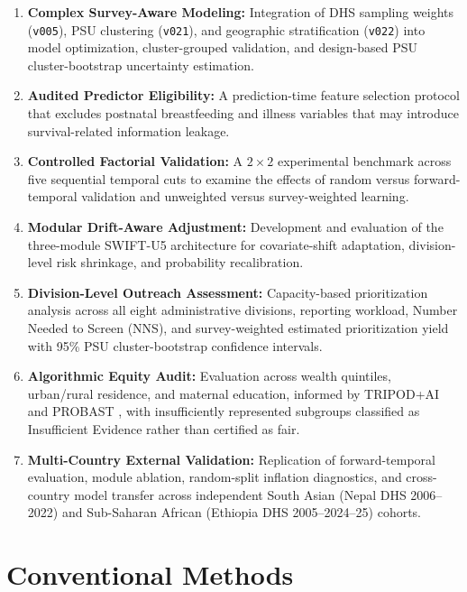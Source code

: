 \documentclass[a4paper,fleqn]{cas-sc}
\begin{document}
\begin{enumerate}
    \item \textbf{Complex Survey-Aware Modeling:} Integration of DHS sampling weights (\texttt{v005}), PSU clustering (\texttt{v021}), and geographic stratification (\texttt{v022}) into model optimization, cluster-grouped validation, and design-based PSU cluster-bootstrap uncertainty estimation.

    \item \textbf{Audited Predictor Eligibility:} A prediction-time feature selection protocol that excludes postnatal breastfeeding and illness variables that may introduce survival-related information leakage.

    \item \textbf{Controlled Factorial Validation:} A $2 \times 2$ experimental benchmark across five sequential temporal cuts to examine the effects of random versus forward-temporal validation and unweighted versus survey-weighted learning.

    \item \textbf{Modular Drift-Aware Adjustment:} Development and evaluation of the three-module SWIFT-U5 architecture for covariate-shift adaptation, division-level risk shrinkage, and probability recalibration.

    \item \textbf{Division-Level Outreach Assessment:} Capacity-based prioritization analysis across all eight administrative divisions, reporting workload, Number Needed to Screen (NNS), and survey-weighted estimated prioritization yield with 95\% PSU cluster-bootstrap confidence intervals.

    \item \textbf{Algorithmic Equity Audit:} Evaluation across wealth quintiles, urban/rural residence, and maternal education, informed by TRIPOD+AI \cite{collins2024} and PROBAST \cite{wolff2019}, with insufficiently represented subgroups classified as Insufficient Evidence rather than certified as fair.

    \item \textbf{Multi-Country External Validation:} Replication of forward-temporal evaluation, module ablation, random-split inflation diagnostics, and cross-country model transfer across independent South Asian (Nepal DHS 2006--2022) and Sub-Saharan African (Ethiopia DHS 2005--2024--25) cohorts.
\end{enumerate}



\section{Conventional Methods}
\label{sec:conventional_methods}
\end{document}
